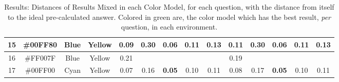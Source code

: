 \begin{table}[!htbp]
{\begin{tabular}{@{}cccccccccccccc@{}}
    \multicolumn{1}{c}{15}      & \multicolumn{1}{c}{\cellcolor[HTML]{00FF80}\#00FF80} & \multicolumn{1}{c|}{Blue}    & \multicolumn{1}{c|}{Yellow}  & \multicolumn{1}{c|}{0.09}                                   & \multicolumn{1}{c|}{0.30}                                  & \multicolumn{1}{c|}{\cellcolor[HTML]{32CB00}\textbf{0.06}} & \multicolumn{1}{c|}{0.11}  & \multicolumn{1}{c||}{0.13}                                  & \multicolumn{1}{c|}{0.11}                                  & \multicolumn{1}{c|}{0.30}                                  & \multicolumn{1}{c|}{\cellcolor[HTML]{32CB00}\textbf{0.06}} & \multicolumn{1}{c|}{0.11}                                  & \multicolumn{1}{c|}{0.13}                                  \\ \midrule
    \multicolumn{1}{c}{16}      & \multicolumn{1}{c}{\cellcolor[HTML]{FF007F}\#FF007F} & \multicolumn{1}{c|}{Blue}    & \multicolumn{1}{c|}{Yellow}  & \multicolumn{1}{c|}{0.21}                                   & \multicolumn{4}{c||}{}                                                                                                                                                                                             & \multicolumn{1}{c|}{0.19}                                  & \multicolumn{4}{c|}{}                                                                                                                                                                                                                             \\ \midrule
    \multicolumn{1}{c}{17}      & \multicolumn{1}{c}{\cellcolor[HTML]{00FF00}\#00FF00} & \multicolumn{1}{c|}{Cyan}    & \multicolumn{1}{c|}{Yellow}  & \multicolumn{1}{c|}{0.07}                                   & \multicolumn{1}{c|}{0.16}                                  & \multicolumn{1}{c|}{\cellcolor[HTML]{32CB00}\textbf{0.05}} & \multicolumn{1}{c|}{0.10}  & \multicolumn{1}{c||}{0.11}                                  & \multicolumn{1}{c|}{0.08}                                  & \multicolumn{1}{c|}{0.17}                                  & \multicolumn{1}{c|}{\cellcolor[HTML]{32CB00}\textbf{0.05}} & \multicolumn{1}{c|}{0.10}                                  & \multicolumn{1}{c|}{0.11}                                  \\ \bottomrule
  \end{tabular}}
  \caption[Results: Distances of Results Mixed in each Color Model]{Results: Distances of Results Mixed in each Color Model, for each question, with the distance from itself to the ideal pre-calculated answer. Colored
  in green are, the color model which has the best result, \emph{per} question, in each environment.}
  \label{table:colormodels_distances_labonline}
\end{table}
